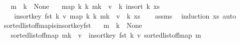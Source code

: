 \begin{isabellebody}
\ \ \ {\isachardoublequoteopen}m\ {\isachardollar}{\kern0pt}{\isachardollar}{\kern0pt}\ k\ {\isacharequal}{\kern0pt}\ None{\isachardoublequoteclose}\isanewline
\ \ \ {\isachardoublequoteopen}map\ {\isacharparenleft}{\kern0pt}{\isasymlambda}k{\isacharprime}{\kern0pt}{\isachardot}{\kern0pt}\ {\isacharparenleft}{\kern0pt}k{\isacharprime}{\kern0pt}{\isacharcomma}{\kern0pt}\ m{\isacharparenleft}{\kern0pt}k\ {\isachardollar}{\kern0pt}{\isachardollar}{\kern0pt}{\isacharcolon}{\kern0pt}{\isacharequal}{\kern0pt}\ v{\isacharparenright}{\kern0pt}\ {\isachardollar}{\kern0pt}{\isachardollar}{\kern0pt}{\isacharbang}{\kern0pt}\ k{\isacharprime}{\kern0pt}{\isacharparenright}{\kern0pt}{\isacharparenright}{\kern0pt}\ {\isacharparenleft}{\kern0pt}insort\ k\ xs{\isacharparenright}{\kern0pt}\ {\isacharequal}{\kern0pt}\isanewline
\ \ \ \ insort{\isacharunderscore}{\kern0pt}key\ fst\ {\isacharparenleft}{\kern0pt}k{\isacharcomma}{\kern0pt}\ v{\isacharparenright}{\kern0pt}\ {\isacharparenleft}{\kern0pt}map\ {\isacharparenleft}{\kern0pt}{\isasymlambda}k{\isacharprime}{\kern0pt}{\isachardot}{\kern0pt}\ {\isacharparenleft}{\kern0pt}k{\isacharprime}{\kern0pt}{\isacharcomma}{\kern0pt}\ m{\isacharparenleft}{\kern0pt}k\ {\isachardollar}{\kern0pt}{\isachardollar}{\kern0pt}{\isacharcolon}{\kern0pt}{\isacharequal}{\kern0pt}\ v{\isacharparenright}{\kern0pt}\ {\isachardollar}{\kern0pt}{\isachardollar}{\kern0pt}{\isacharbang}{\kern0pt}\ k{\isacharprime}{\kern0pt}{\isacharparenright}{\kern0pt}{\isacharparenright}{\kern0pt}\ xs{\isacharparenright}{\kern0pt}{\isachardoublequoteclose}\isanewline
%
\isadelimproof
\ \ %
\endisadelimproof
%
\isatagproof
{}\isamarkupfalse%
\ assms\ \isamarkupfalse%
\ {\isacharparenleft}{\kern0pt}induction\ xs{\isacharparenright}{\kern0pt}\ auto%
\endisatagproof
{\isafoldproof}%
%
\isadelimproof
\isanewline
%
\endisadelimproof
\isanewline
{}\isamarkupfalse%
\ sorted{\isacharunderscore}{\kern0pt}list{\isacharunderscore}{\kern0pt}of{\isacharunderscore}{\kern0pt}fmap{\isacharunderscore}{\kern0pt}is{\isacharunderscore}{\kern0pt}insort{\isacharunderscore}{\kern0pt}key{\isacharunderscore}{\kern0pt}fst{\isacharcolon}{\kern0pt}\isanewline
\ \ \ {\isachardoublequoteopen}m\ {\isachardollar}{\kern0pt}{\isachardollar}{\kern0pt}\ k\ {\isacharequal}{\kern0pt}\ None{\isachardoublequoteclose}\isanewline
\ \ \ {\isachardoublequoteopen}sorted{\isacharunderscore}{\kern0pt}list{\isacharunderscore}{\kern0pt}of{\isacharunderscore}{\kern0pt}fmap\ {\isacharparenleft}{\kern0pt}m{\isacharparenleft}{\kern0pt}k\ {\isachardollar}{\kern0pt}{\isachardollar}{\kern0pt}{\isacharcolon}{\kern0pt}{\isacharequal}{\kern0pt}\ v{\isacharparenright}{\kern0pt}{\isacharparenright}{\kern0pt}\ {\isacharequal}{\kern0pt}\ insort{\isacharunderscore}{\kern0pt}key\ fst\ {\isacharparenleft}{\kern0pt}k{\isacharcomma}{\kern0pt}\ v{\isacharparenright}{\kern0pt}\ {\isacharparenleft}{\kern0pt}sorted{\isacharunderscore}{\kern0pt}list{\isacharunderscore}{\kern0pt}of{\isacharunderscore}{\kern0pt}fmap\ m{\isacharparenright}{\kern0pt}{\isachardoublequoteclose}\isanewline

\end{isabellebody}
